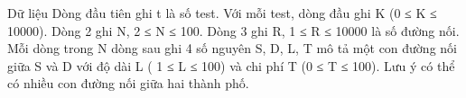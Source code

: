 Dữ liệu
Dòng đầu tiên ghi t là số test. Với mỗi test, dòng đầu ghi K (0 ≤ K ≤ 10000). Dòng 2 ghi N, 2 ≤ N ≤ 100. Dòng 3 ghi R, 1 ≤ R ≤ 10000 là số đường nối. Mỗi dòng trong N dòng sau ghi 4 số nguyên S, D, L, T mô tả một con đường nối giữa S và D với độ dài L ( 1 ≤ L ≤ 100) và chi phí T (0 ≤ T ≤ 100). Lưu ý có thể có nhiều con đường nối giữa hai thành phố.